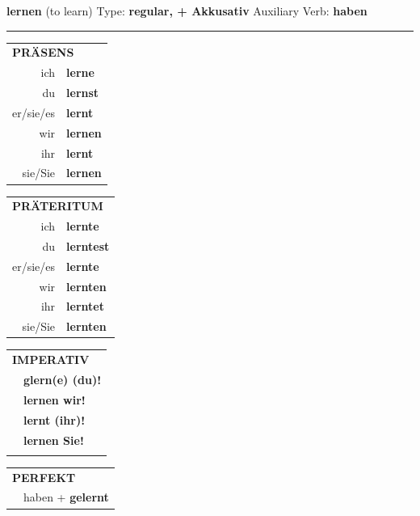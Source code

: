 \documentclass[10pt,a4paper]{revtex4-2}
\begin{document}
\begin{verbbox-acc}
    {\Large \bf lernen} (to learn) \hfill Type: \textbf{regular, + Akkusativ} \hfill Auxiliary Verb: \textbf{haben} 
    
     \vspace{5pt}

    \hrule
    
    \vspace{5pt}

  \begin{tabular}{rl}
     \multicolumn{2}{l}{\textbf{PRÄSENS} }\\
    ich & \textbf{lerne}\\
    du & \textbf{lernst}\\
    er/sie/es & \textbf{lernt}\\
    wir & \textbf{lernen}\\
    ihr & \textbf{lernt}\\
    sie/Sie & \textbf{lernen}\\
  \end{tabular}
  \hfill
     \begin{tabular}{rl}
    \multicolumn{2}{l}{\textbf{PRÄTERITUM} }\\
    ich & \textbf{lernte}\\
    du & \textbf{lerntest}\\
    er/sie/es & \textbf{lernte}\\
    wir & \textbf{lernten}\\
    ihr & \textbf{lerntet}\\
    sie/Sie & \textbf{lernten}\\
  \end{tabular}
  \hfill
  \begin{tabular}{rl}
     \multicolumn{2}{l}{\textbf{IMPERATIV} }\\
   & \textbf{glern(e) (du)!}\\
   & \textbf{lernen wir!}\\
   & \textbf{lernt (ihr)!}\\
   & \textbf{lernen Sie!}\\
   & \vspace{10pt}
  \end{tabular}

    \vspace{10pt}

 \begin{tabular}{rl}
     \multicolumn{2}{l}{\textbf{PERFEKT}}\\
  &  haben + \textbf{gelernt}\\
  \end{tabular}
\hfill
   \begin{tabular}{rl}
   

\end{tabular}
\end{verbbox-acc}
\end{document}
